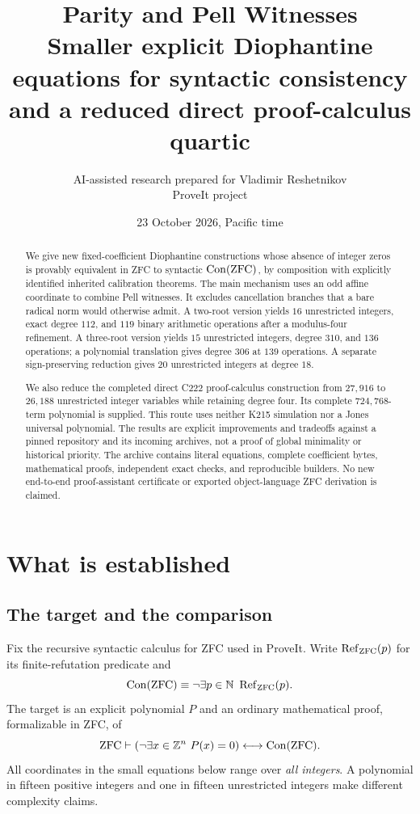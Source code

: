 \documentclass[11pt,letterpaper]{article}
\title{\textbf{Parity and Pell Witnesses}\\[0.4em]
\large Smaller explicit Diophantine equations for syntactic consistency\\
and a reduced direct proof-calculus quartic}
\author{AI-assisted research prepared for Vladimir Reshetnikov\\
\small ProveIt project}
\date{23 October 2026, Pacific time}
\theoremstyle{remark}\newtheorem{remark}[theorem]{Remark}
\newcommand{\Z}{\mathbb Z}\newcommand{\N}{\mathbb N}\newcommand{\Q}{\mathbb Q}
\newcommand{\Con}{\operatorname{Con}}\newcommand{\Refut}{\operatorname{Ref}}
\begin{document}
\maketitle
\begin{abstract}
We give new fixed-coefficient Diophantine constructions whose absence of
integer zeros is provably equivalent in ZFC to syntactic $\Con(\ZFC)$,
by composition with explicitly identified inherited calibration theorems.
The main mechanism uses an odd affine coordinate to combine Pell witnesses.
It excludes cancellation branches that a bare radical norm would otherwise
admit. A two-root version yields $16$ unrestricted integers, exact degree
$112$, and $119$ binary arithmetic operations after a modulus-four
refinement. A three-root version yields $15$ unrestricted integers,
degree $310$, and $136$ operations; a polynomial translation gives
degree $306$ at $139$ operations. A separate sign-preserving
reduction gives $20$ unrestricted integers at degree $18$.

We also reduce the completed direct C222 proof-calculus construction from
$27{,}916$ to $26{,}188$ unrestricted integer variables while retaining
degree four. Its complete $724{,}768$-term polynomial is supplied.
This route uses neither K215 simulation nor a Jones universal polynomial.
The results are explicit improvements and tradeoffs against a pinned
repository and its incoming archives, not a proof of global minimality
or historical priority. The archive contains literal equations, complete
coefficient bytes, mathematical proofs, independent exact checks, and
reproducible builders. No new end-to-end proof-assistant certificate or
exported object-language ZFC derivation is claimed.
\end{abstract}
\tableofcontents
\newpage

\section{What is established}

\subsection{The target and the comparison}
Fix the recursive syntactic calculus for ZFC used in ProveIt. Write
$\Refut_{\ZFC}(p)$ for its finite-refutation predicate and
\[
 \Con(\ZFC)\equiv\neg\exists p\in\N\ \Refut_{\ZFC}(p).
\]
The target is an explicit polynomial $P$ and an ordinary mathematical
proof, formalizable in ZFC, of
\begin{equation}\label{eq:target}
 \ZFC\vdash
 \left(\neg\exists x\in\Z^n\ P(x)=0\right)
 \longleftrightarrow\Con(\ZFC).
\end{equation}
All coordinates in the small equations below range over \emph{all integers}.
A polynomial in fifteen positive integers and one in fifteen unrestricted
integers make different complexity claims.
\end{document}
